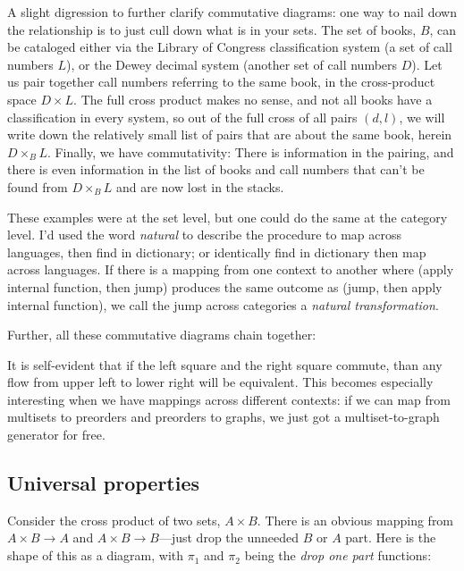 \documentclass[11pt]{article}
\begin{document}
A slight digression to further clarify commutative diagrams:
one way to nail down the relationship is to just cull down what is in your sets. The set
of books, $B$, can be cataloged either via the Library of Congress classification system
(a set of call numbers $L$), or the Dewey decimal system (another set of call numbers
$D$). Let us pair together call numbers referring to the same book, in the cross-product
space $D\times L$. The full cross product makes no sense, and
not all books have a classification in every system, so
out of the full cross of all pairs $(d, l)$,
we will write down the relatively small list of pairs that are about the same book, herein $D\times_B L$.
Finally, we have commutativity:
There is information in the pairing, and there is even information in the list of books
and call numbers that can't be found from $D\times_B L$ and are now lost in the stacks.

These examples were at the set level, but one could do the same at the category level.
I'd used the word {\em natural} to describe the procedure to map across languages,
then find in dictionary; or identically find in dictionary then map across languages.
If there is a mapping from one context to another where (apply internal function,
then jump) produces the same outcome as (jump, then apply internal function), we call
the jump across categories a {\em natural transformation}.

Further, all these commutative diagrams chain together:


It is self-evident that if the left square and the right square commute, than any flow
from upper left to lower right will be equivalent. This becomes especially interesting
when we have mappings across different contexts: if we can map from multisets to preorders
and preorders to graphs, we just got a multiset-to-graph generator for free.

\subsection{Universal properties}
Consider the cross product of two sets, $A\times B$. There is an obvious mapping from
$A\times B \to A$ and $A\times B \to B$---just drop the unneeded $B$ or $A$ part. Here
is the shape of this as a diagram, with $\pi_1$ and $\pi_2$ being the {\em drop one
part} functions:
\end{document}
